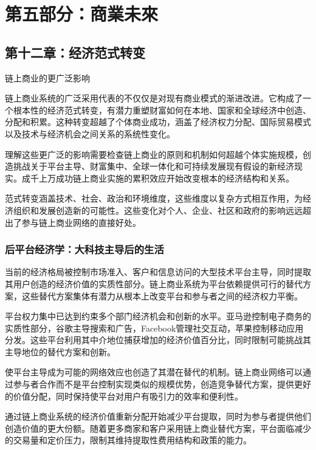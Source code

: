 \documentclass[
  Letterpaper,
]{scrbook}
\begin{document}
\part{第五部分：商業未來}

\chapter{第十二章：经济范式转变}\label{sec-paradigm-shift}

链上商业的更广泛影响

链上商业系统的广泛采用代表的不仅仅是对现有商业模式的渐进改进。它构成了一个根本性的经济范式转变，有潜力重塑财富如何在本地、国家和全球经济中创造、分配和积累。这种转变超越了个体商业成功，涵盖了经济权力分配、国际贸易模式以及技术与经济机会之间关系的系统性变化。

理解这些更广泛的影响需要检查链上商业的原则和机制如何超越个体实施规模，创造挑战关于平台主导、财富集中、全球一体化和可持续发展现有假设的新经济现实。成千上万成功链上商业实施的累积效应开始改变根本的经济结构和关系。

范式转变涵盖技术、社会、政治和环境维度，这些维度以复杂方式相互作用，为经济组织和发展创造新的可能性。这些变化对个人、企业、社区和政府的影响远远超出了参与链上商业网络的直接好处。

\section{后平台经济学：大科技主导后的生活}\label{ux540eux5e73ux53f0ux7ecfux6d4eux5b66ux5927ux79d1ux6280ux4e3bux5bfcux540eux7684ux751fux6d3b}

当前的经济格局被控制市场准入、客户和信息访问的大型技术平台主导，同时提取其用户创造的经济价值的实质性部分。链上商业系统为平台依赖提供可行的替代方案，这些替代方案集体有潜力从根本上改变平台和参与者之间的经济权力平衡。

平台权力集中已达到约束多个部门经济机会和创新的水平。亚马逊控制电子商务的实质性部分，谷歌主导搜索和广告，Facebook管理社交互动，苹果控制移动应用分发。这些平台利用其中介地位捕获增加的经济价值百分比，同时限制可能挑战其主导地位的替代方案和创新。

使平台主导成为可能的网络效应也创造了其潜在替代的机制。链上商业网络可以通过参与者合作而不是平台控制实现类似的规模优势，创造竞争替代方案，提供更好的价值分配，同时保持使平台对用户有吸引力的效率和便利性。

通过链上商业系统的经济价值重新分配开始减少平台提取，同时为参与者提供他们创造价值的更大份额。随着更多商家和客户采用链上商业替代方案，平台面临减少的交易量和定价压力，限制其维持提取性费用结构和政策的能力。
\end{document}
